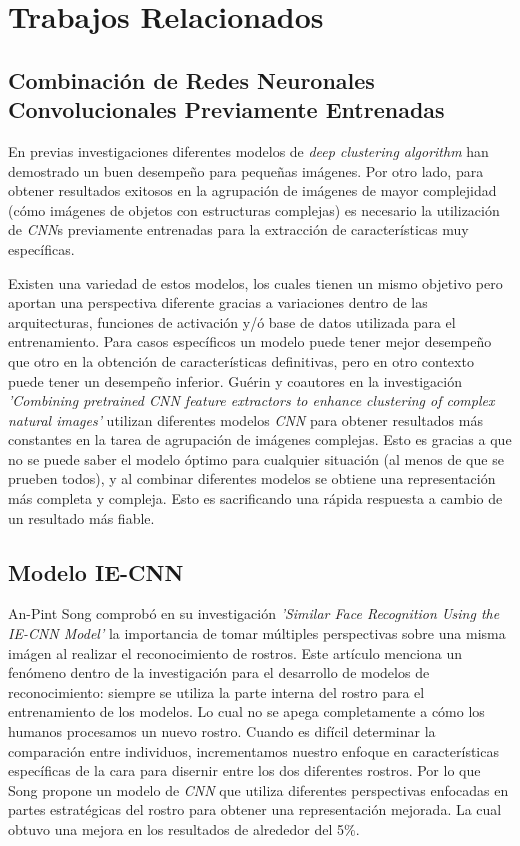 \documentclass[letterpaper, 10 pt, conference]{ieeeconf}  %
\begin{document}
    \section{Trabajos Relacionados}

    \subsection{Combinación de Redes Neuronales Convolucionales Previamente Entrenadas}
    En previas investigaciones diferentes modelos de \textit{deep clustering algorithm}
    han demostrado un buen desempeño para pequeñas imágenes. Por otro lado, para
    obtener resultados exitosos en la agrupación de imágenes de mayor complejidad
    (cómo imágenes de objetos con estructuras complejas) es necesario la utilización
    de \textit{CNN}s previamente entrenadas para la extracción de características muy específicas.
    
    Existen una variedad de estos modelos, los cuales tienen un mismo objetivo pero aportan una
    perspectiva diferente gracias a variaciones dentro de las arquitecturas, funciones de
    activación y/ó base de datos utilizada para el entrenamiento. Para casos específicos un modelo
    puede tener mejor desempeño que otro en la obtención de características definitivas, pero en
    otro contexto puede tener un desempeño inferior. Guérin y coautores en la investigación
    \textit{'Combining pretrained CNN feature extractors to enhance clustering of complex natural images'}
    utilizan diferentes modelos \textit{CNN} para obtener resultados más constantes en la tarea de
    agrupación de imágenes complejas. Esto es gracias a que no se puede saber el modelo óptimo para
    cualquier situación (al menos de que se prueben todos), y al combinar diferentes modelos se
    obtiene una representación más completa y compleja. Esto es sacrificando una rápida respuesta
    a cambio de un resultado más fiable.\cite{CombiningCNN}


    \subsection{Modelo IE-CNN}
    An-Pint Song comprobó en su investigación \textit{'Similar Face Recognition Using the IE-CNN
    Model'} la importancia de tomar múltiples perspectivas sobre una misma imágen al realizar el
    reconocimiento de rostros. Este artículo menciona un fenómeno dentro de la investigación para
    el desarrollo de modelos de reconocimiento: siempre se utiliza la parte interna del rostro
    para el entrenamiento de los modelos. Lo cual no se apega completamente a cómo los humanos
    procesamos un nuevo rostro. Cuando es difícil determinar la comparación entre individuos,
    incrementamos nuestro enfoque en características específicas de la cara para disernir entre los
    dos diferentes rostros. \cite{Young1987} \cite{Andrews2010} Por lo que Song propone un modelo
    de \textit{CNN} que utiliza diferentes perspectivas enfocadas en partes estratégicas del rostro
    para obtener una representación mejorada. La cual obtuvo una mejora en los resultados de
    alrededor del 5\%. \cite{IECNN}
\end{document}
